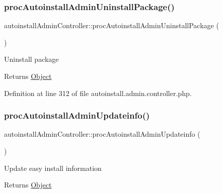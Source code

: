 \mbox{\label{classautoinstallAdminController_af289464bb0d9238e82962bd5ce74076f}} 
\subsubsection{\texorpdfstring{proc\+Autoinstall\+Admin\+Uninstall\+Package()}{procAutoinstallAdminUninstallPackage()}}
{\footnotesize\ttfamily autoinstall\+Admin\+Controller\+::proc\+Autoinstall\+Admin\+Uninstall\+Package (\begin{DoxyParamCaption}{ }\end{DoxyParamCaption})}

Uninstall package

\begin{DoxyReturn}{Returns}
\hyperlink{classObject}{Object} 
\end{DoxyReturn}


Definition at line 312 of file autoinstall.\+admin.\+controller.\+php.

\mbox{\label{classautoinstallAdminController_ac498f2779268ea03dd40799c72af90de}} 
\subsubsection{\texorpdfstring{proc\+Autoinstall\+Admin\+Updateinfo()}{procAutoinstallAdminUpdateinfo()}}
{\footnotesize\ttfamily autoinstall\+Admin\+Controller\+::proc\+Autoinstall\+Admin\+Updateinfo (\begin{DoxyParamCaption}{ }\end{DoxyParamCaption})}

Update easy install information

\begin{DoxyReturn}{Returns}
\hyperlink{classObject}{Object} 
\end{DoxyReturn}


